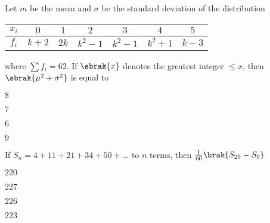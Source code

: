     \begin{figure}[H]
        \centering
    \end{figure}

    \item  
    Let $m$ be the mean and $\sigma$ be the standard deviation of the distribution
    \begin{table}[H]
        \centering
        \begin{tabular}{|c |c |c |c |c |c |c |}
        
        \hline
             $x_i$ & $0$ & $1$ & $2$ & $3$ & $4$ & $5$ \\
        \hline
             $f_i$ & $k + 2$ & $2k$ & $k^2 - 1$ & $k^2 -1$ & $k^2 +1$ & $k - 3$ \\
        \hline
        \end{tabular}
    \end{table}
    where $\sum f_i = 62$. If $\sbrak{x}$ denotes the greatest integer $\leq x $, then $\sbrak{\mu^2 + \sigma^2}$ is equal to

    \hfill{}

    \begin{enumerate}
    \begin{multicols}{4}
        \item $8$
        \item $7$
        \item $6$
        \item $9$
    \end{multicols}
    \end{enumerate}

    \item 
    If $S_n = 4 + 11 + 21 + 34 + 50 + \dots$ to $n$ terms, then $\frac{1}{60}\brak{S_{29} - S_9}$ 
    
    \hfill{}

    \begin{enumerate}
    \begin{multicols}{4}
        \item $220$
        \item $227$
        \item $226$
        \item $223$
    \end{multicols}
    \end{enumerate}

